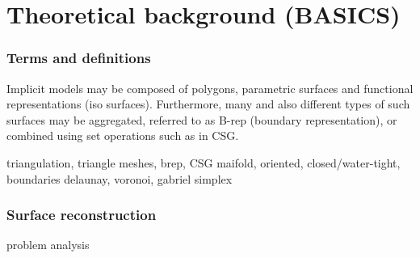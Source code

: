 \chapter{Theoretical background (BASICS)}

\subsection{Terms and definitions}


Implicit models may be composed of polygons, parametric surfaces and functional representations (iso surfaces).
Furthermore, many and also different types of such surfaces may be aggregated, referred to as B-rep (boundary representation), or combined using set operations such as in CSG.


triangulation,
triangle meshes,
brep, CSG
maifold, oriented, closed/water-tight, boundaries
delaunay, voronoi, gabriel simplex


\subsection{Surface reconstruction}
problem analysis



